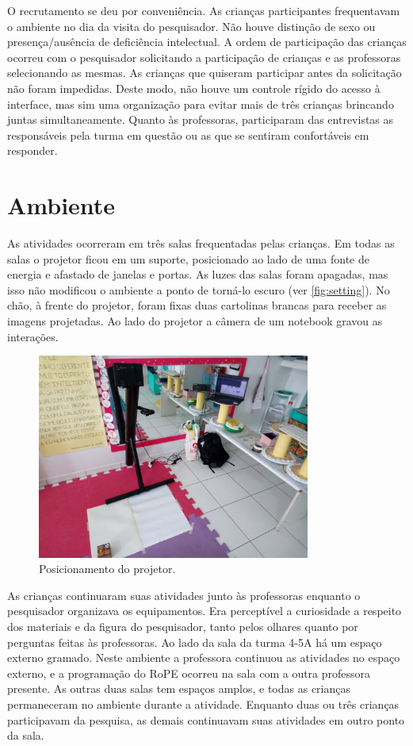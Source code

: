O recrutamento se deu por conveniência. As crianças participantes frequentavam o ambiente no dia da visita do pesquisador. Não houve distinção de sexo ou presença/ausência de deficiência intelectual. A ordem de participação das crianças ocorreu com o pesquisador solicitando a participação de crianças e as professoras selecionando as mesmas. As crianças que quiseram participar antes da solicitação não foram impedidas. Deste modo, não houve um controle rígido do acesso à interface, mas sim uma organização para evitar mais de três crianças brincando juntas simultaneamente. Quanto às professoras, participaram das entrevistas as responsáveis pela turma em questão ou as que se sentiram confortáveis em responder.

\section{Ambiente}
\label{sec:ambiente}
As atividades ocorreram em três salas frequentadas pelas crianças. Em todas as salas o projetor ficou em um suporte, posicionado ao lado de uma fonte de energia e afastado de janelas e portas. As luzes das salas foram apagadas, mas isso não modificou o ambiente a ponto de torná-lo escuro (ver \autoref{fig:setting}). No chão, à frente do projetor, foram fixas duas cartolinas brancas para receber as imagens projetadas. Ao lado do projetor a câmera de um notebook gravou as interações. 

\begin{figure}[!h]
    \centering
    \includegraphics[width=0.8\textwidth,fbox]{figs/setting_projector.jpg}
    \caption{Posicionamento do projetor.}
    \label{fig:setting}
\end{figure}

As crianças continuaram suas atividades junto às professoras enquanto o pesquisador organizava os equipamentos. Era perceptível a curiosidade a respeito dos materiais e da figura do pesquisador, tanto pelos olhares quanto por perguntas feitas às professoras. Ao lado da sala da turma 4-5A há um espaço externo gramado. Neste ambiente a professora continuou as atividades no espaço externo, e a programação do RoPE ocorreu na sala com a outra professora presente. As outras duas salas tem espaços amplos, e todas as crianças permaneceram no ambiente durante a atividade. Enquanto duas ou três crianças participavam da pesquisa, as demais continuavam suas atividades em outro ponto da sala.
 
